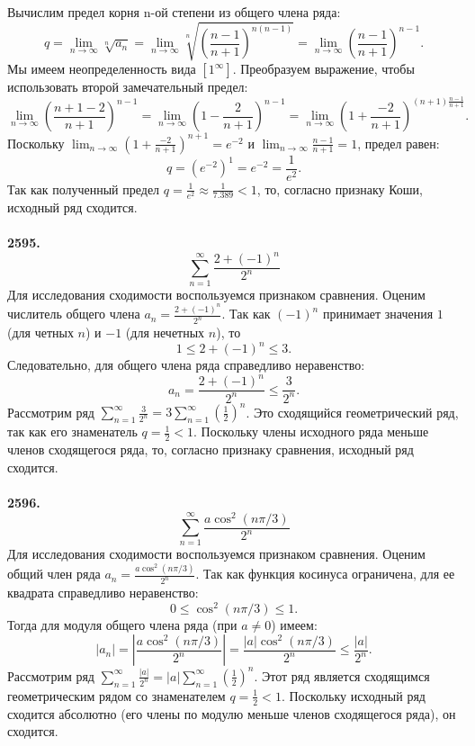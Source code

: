 \documentclass[a4paper, 12pt]{report}
\numberwithin{equation}{section}
\begin{document}
	Вычислим предел корня n-ой степени из общего члена ряда:
	$$ q = \lim_{n \to \infty} \sqrt[n]{a_n} = \lim_{n \to \infty} \sqrt[n]{\left(\frac{n-1}{n+1}\right)^{n(n-1)}} = \lim_{n \to \infty} \left(\frac{n-1}{n+1}\right)^{n-1}. $$
	Мы имеем неопределенность вида $\left[1^{\infty}\right]$. Преобразуем выражение, чтобы использовать второй замечательный предел:
	$$ \lim_{n \to \infty} \left(\frac{n+1-2}{n+1}\right)^{n-1} = \lim_{n \to \infty} \left(1-\frac{2}{n+1}\right)^{n-1} = \lim_{n \to \infty} \left(1+\frac{-2}{n+1}\right)^{(n+1)\frac{n-1}{n+1}}. $$
	Поскольку $\lim_{n \to \infty} \left(1+\frac{-2}{n+1}\right)^{n+1} = e^{-2}$ и $\lim_{n \to \infty} \frac{n-1}{n+1} = 1$, предел равен:
	$$ q = (e^{-2})^1 = e^{-2} = \frac{1}{e^2}. $$
	Так как полученный предел $q = \frac{1}{e^2} \approx \frac{1}{7.389} < 1$, то, согласно признаку Коши, исходный ряд сходится.
	\\\\
	\textbf{2595.}
	$$\sum_{n=1}^{\infty} \frac{2+(-1)^n}{2^n}$$
	Для исследования сходимости воспользуемся признаком сравнения. Оценим числитель общего члена $a_n = \frac{2+(-1)^n}{2^n}$.
	Так как $(-1)^n$ принимает значения $1$ (для четных $n$) и $-1$ (для нечетных $n$), то
	$$ 1 \le 2+(-1)^n \le 3. $$
	Следовательно, для общего члена ряда справедливо неравенство:
	$$ a_n = \frac{2+(-1)^n}{2^n} \le \frac{3}{2^n}. $$
	Рассмотрим ряд $\sum_{n=1}^{\infty} \frac{3}{2^n} = 3\sum_{n=1}^{\infty} \left(\frac{1}{2}\right)^n$. Это сходящийся геометрический ряд, так как его знаменатель $q = \frac{1}{2} < 1$.
	Поскольку члены исходного ряда меньше членов сходящегося ряда, то, согласно признаку сравнения, исходный ряд сходится.
	\\\\
	\textbf{2596.}
	$$\sum_{n=1}^{\infty} \frac{a \cos^2(n\pi/3)}{2^n}$$
	Для исследования сходимости воспользуемся признаком сравнения. Оценим общий член ряда $a_n = \frac{a \cos^2(n\pi/3)}{2^n}$.
	Так как функция косинуса ограничена, для ее квадрата справедливо неравенство:
	$$ 0 \le \cos^2(n\pi/3) \le 1. $$
	Тогда для модуля общего члена ряда (при $a \neq 0$) имеем:
	$$ |a_n| = \left|\frac{a \cos^2(n\pi/3)}{2^n}\right| = \frac{|a| \cos^2(n\pi/3)}{2^n} \le \frac{|a|}{2^n}. $$
	Рассмотрим ряд $\sum_{n=1}^{\infty} \frac{|a|}{2^n} = |a|\sum_{n=1}^{\infty} \left(\frac{1}{2}\right)^n$. Этот ряд является сходящимся геометрическим рядом со знаменателем $q = \frac{1}{2} < 1$.
	Поскольку исходный ряд сходится абсолютно (его члены по модулю меньше членов сходящегося ряда), он сходится.
\end{document}
